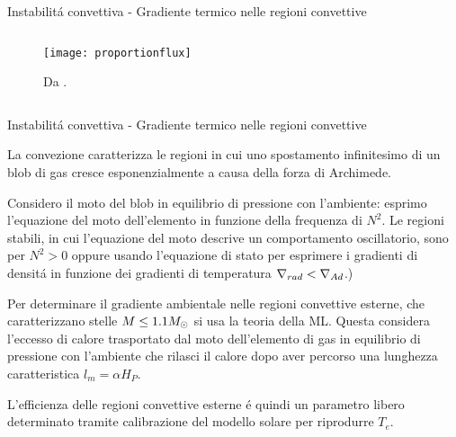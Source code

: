 \documentclass[10pt,xcolor={usenames},fleqn,mathserif,serif]{beamer}
\begin{document}
\begin{frame}{Instabilit\'a convettiva - Gradiente termico nelle regioni convettive}
\begin{columns}
\begin{column}{0.55\textwidth}

\begin{figure}[!h]
    \texttt{[image: proportionflux]}
    \caption{Da \cite{christensen1997effects}.}
\end{figure}


\end{column}

\end{columns}

\end{frame}

\begin{wordonframe}{Instabilit\'a convettiva - Gradiente termico nelle regioni convettive}

La convezione caratterizza le regioni in cui uno spostamento infinitesimo di un blob di gas cresce esponenzialmente a causa della forza di Archimede.

{\small Considero il moto del blob in equilibrio di pressione con l'ambiente: esprimo l'equazione del moto dell'elemento in funzione della frequenza di \bv{} $N^2$. Le regioni stabili, in cui l'equazione del moto descrive un comportamento oscillatorio, sono per $N^2>0$  oppure usando l'equazione di stato per esprimere i gradienti di densit\'a in funzione dei gradienti di temperatura $\nabla_{rad}{}<\nabla_{Ad}{}$.)
}


Per determinare il gradiente ambientale nelle regioni convettive esterne, che caratterizzano stelle $M\leq1.1M_{\odot}{}$ si usa la teoria della ML. Questa considera l'eccesso di calore trasportato dal moto dell'elemento di gas in equilibrio di pressione con l'ambiente che rilasci il calore dopo aver percorso una lunghezza caratteristica $l_m=\alpha H_P$.

L'efficienza delle regioni convettive esterne \'e quindi un parametro libero determinato tramite calibrazione del modello solare per riprodurre $T_e$.

\end{wordonframe}
\end{document}
